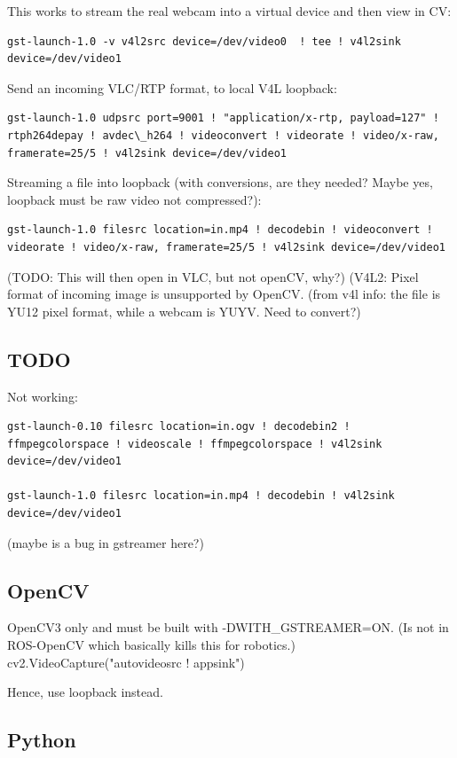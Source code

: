 \documentclass[oneside,english]{scrbook}
\begin{document}
This works to stream the real webcam into a virtual device and then view in CV:
\begin{lstlisting}
gst-launch-1.0 -v v4l2src device=/dev/video0  ! tee ! v4l2sink device=/dev/video1
\end{lstlisting}

Send an incoming VLC/RTP format, to local V4L loopback: 
\begin{lstlisting}
gst-launch-1.0 udpsrc port=9001 ! "application/x-rtp, payload=127" ! rtph264depay ! avdec\_h264 ! videoconvert ! videorate ! video/x-raw, framerate=25/5 ! v4l2sink device=/dev/video1
\end{lstlisting}

Streaming a file into loopback (with conversions, are they needed? Maybe yes, loopback must be raw video not compressed?):
\begin{lstlisting}
gst-launch-1.0 filesrc location=in.mp4 ! decodebin ! videoconvert ! videorate ! video/x-raw, framerate=25/5 ! v4l2sink device=/dev/video1
\end{lstlisting}
(TODO: This will then open in VLC, but not openCV, why?)
(V4L2: Pixel format of incoming image is unsupported by OpenCV.
(from v4l info: the file is YU12 pixel format, while a webcam is YUYV. Need to convert?)

\subsection{TODO}

Not working:
\begin{lstlisting}
gst-launch-0.10 filesrc location=in.ogv ! decodebin2 ! ffmpegcolorspace ! videoscale ! ffmpegcolorspace ! v4l2sink device=/dev/video1 

gst-launch-1.0 filesrc location=in.mp4 ! decodebin ! v4l2sink device=/dev/video1
\end{lstlisting}
(maybe is a bug in gstreamer here?)

\subsection{OpenCV}
OpenCV3 only and must be built with -DWITH_GSTREAMER=ON. (Is not in ROS-OpenCV which basically kills this for robotics.)
cv2.VideoCapture("autovideosrc ! appsink")

Hence, use loopback instead.


\subsection{Python}
\end{document}
